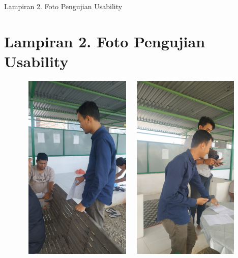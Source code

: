 \begin{appendices}{Lampiran 2. Foto Pengujian Usability}
    \section*{Lampiran 2. Foto Pengujian Usability}
    \begin{figure}[H]
            \hspace*{0.8cm}
            \includegraphics[width=5.5cm,height=9cm]{gambar/dokumentasi/foto1}
            \hspace*{0.3cm}
            \includegraphics[width=5.5cm,height=9cm]{gambar/dokumentasi/foto2}
    \end{figure}
        

\end{appendices}
